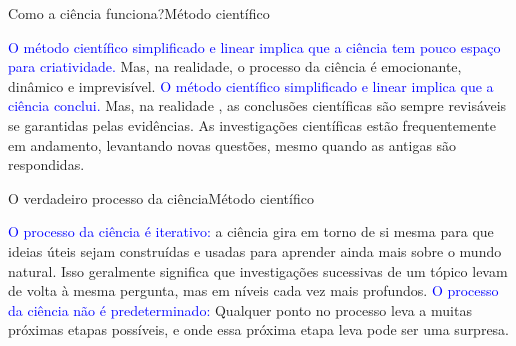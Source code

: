\documentclass[t]{beamer}
\begin{document}

\begin{ftst}{Como a ciência funciona?}{Método científico}
\justifying
\small

\textcolor{blue}{O método científico simplificado e linear implica que a ciência tem pouco espaço para criatividade.}
\vone
Mas, na realidade, o processo da ciência é emocionante, dinâmico e imprevisível. 
\vone
\vone
\textcolor{blue}{O método científico simplificado e linear implica que a ciência conclui.}
\vone
Mas, na realidade , as conclusões científicas são sempre revisáveis se garantidas pelas evidências. As investigações científicas estão frequentemente em andamento, levantando novas questões, mesmo quando as antigas são respondidas.
\end{ftst}



\begin{ftst}{O verdadeiro processo da ciência}{Método científico}
\justifying
\small

\textcolor{blue}{O processo da ciência é iterativo:}
\vone
a ciência gira em torno de si mesma para que ideias úteis sejam construídas e usadas para aprender ainda mais sobre o mundo natural. Isso geralmente significa que investigações sucessivas de um tópico levam de volta à mesma pergunta, mas em níveis cada vez mais profundos.
\vone
\vone
\textcolor{blue}{O processo da ciência não é predeterminado:}
\vone
Qualquer ponto no processo leva a muitas próximas etapas possíveis, e onde essa próxima etapa leva pode ser uma surpresa.

\end{ftst}

\end{document}
